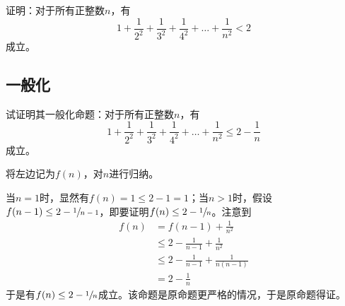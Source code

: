 

证明：对于所有正整数$n$，有
\[ 1 + \frac1{2^2} + \frac1{3^2} + \frac1{4^2} + \dots + \frac1{n^2} < 2 \]
成立。

\subsection{一般化}

试证明其一般化命题：对于所有正整数$n$，有
\[ 1 + \frac1{2^2} + \frac1{3^2} + \frac1{4^2} + \dots + \frac1{n^2} \le 2 - \frac1n \]
成立。

将左边记为$f(n)$，对$n$进行归纳。

当$n = 1$时，显然有$f(n) = 1 \le 2 - 1 = 1$；当$n > 1$时，假设$f(n - 1) \le 2 - \sfrac1{n - 1}$，即要证明$f(n) \le 2 - \sfrac1n$。注意到
\begin{align*}
  f(n) &= f(n - 1) + \frac1{n^2} \\
  &\le 2 - \frac1{n - 1} + \frac1{n^2} \\
  &\le 2 - \frac1{n - 1} + \frac1{n(n - 1)} \\
  &= 2 - \frac1n
\end{align*}
于是有$f(n) \le 2 - \sfrac1n$成立。该命题是原命题更严格的情况，于是原命题得证。
